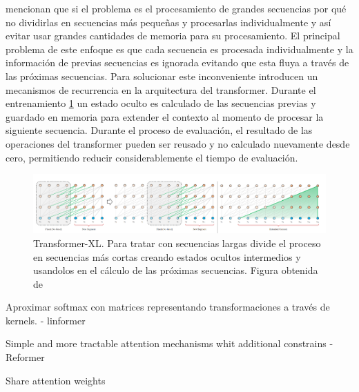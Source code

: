 \citeauthor*{DBLP:journals/corr/abs-1901-02860} mencionan que si el problema es el procesamiento de
grandes secuencias por qué no dividirlas en secuencias más pequeñas y procesarlas individualmente
y así evitar usar grandes cantidades de memoria para su procesamiento. El principal problema de este
enfoque es que cada secuencia es procesada individualmente y la información de previas secuencias es
ignorada evitando que esta fluya a través de las próximas secuencias. Para solucionar este
inconveniente introducen un mecanismos de recurrencia en la arquitectura del transformer. Durante el
entrenamiento \ref{fig:trans-xl} un estado oculto es calculado de las secuencias previas y guardado
en memoria para extender el contexto al momento de procesar la siguiente secuencia. Durante el
proceso de evaluación, el resultado de las operaciones del transformer pueden ser reusado y no
calculado nuevamente desde cero, permitiendo reducir considerablemente el tiempo de evaluación.

\begin{figure}[ht!]
    \centering
    \includegraphics[width=0.8 \textwidth]{Chapters/1. Transformer/Figures/transformer/trans-XL.png}
    \caption{Transformer-XL. Para tratar con secuencias largas divide el proceso en secuencias más
             cortas creando estados ocultos intermedios y usandolos en el cálculo de las próximas
             secuencias. Figura obtenida de \cite{DBLP:journals/corr/abs-1901-02860}}
    \label{fig:trans-xl}
\end{figure}


Aproximar softmax con matrices representando transformaciones a través de kernels.
- linformer

Simple and more tractable attention mechanisms whit additional constrains
- Reformer

Share attention weights
